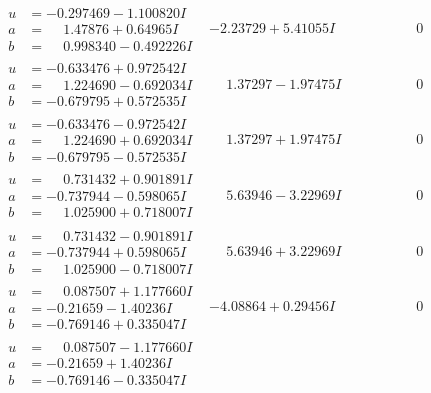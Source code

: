 \documentclass[1p]{elsarticle_modified}
\theoremstyle{definition}
\begin{document}
$$\begin{array}{c|c|c}
\begin{aligned}
u &= -0.297469 - 1.100820 I \\
a &= \phantom{-}1.47876 + 0.64965 I \\
b &= \phantom{-}0.998340 - 0.492226 I\end{aligned}
 & -2.23729 + 5.41055 I & \phantom{-0.000000 } 0 \\ \hline\begin{aligned}
u &= -0.633476 + 0.972542 I \\
a &= \phantom{-}1.224690 - 0.692034 I \\
b &= -0.679795 + 0.572535 I\end{aligned}
 & \phantom{-}1.37297 - 1.97475 I & \phantom{-0.000000 } 0 \\ \hline\begin{aligned}
u &= -0.633476 - 0.972542 I \\
a &= \phantom{-}1.224690 + 0.692034 I \\
b &= -0.679795 - 0.572535 I\end{aligned}
 & \phantom{-}1.37297 + 1.97475 I & \phantom{-0.000000 } 0 \\ \hline\begin{aligned}
u &= \phantom{-}0.731432 + 0.901891 I \\
a &= -0.737944 - 0.598065 I \\
b &= \phantom{-}1.025900 + 0.718007 I\end{aligned}
 & \phantom{-}5.63946 - 3.22969 I & \phantom{-0.000000 } 0 \\ \hline\begin{aligned}
u &= \phantom{-}0.731432 - 0.901891 I \\
a &= -0.737944 + 0.598065 I \\
b &= \phantom{-}1.025900 - 0.718007 I\end{aligned}
 & \phantom{-}5.63946 + 3.22969 I & \phantom{-0.000000 } 0 \\ \hline\begin{aligned}
u &= \phantom{-}0.087507 + 1.177660 I \\
a &= -0.21659 - 1.40236 I \\
b &= -0.769146 + 0.335047 I\end{aligned}
 & -4.08864 + 0.29456 I & \phantom{-0.000000 } 0 \\ \hline\begin{aligned}
u &= \phantom{-}0.087507 - 1.177660 I \\
a &= -0.21659 + 1.40236 I \\
b &= -0.769146 - 0.335047 I\end{aligned}

\end{array}$$
\end{document}
